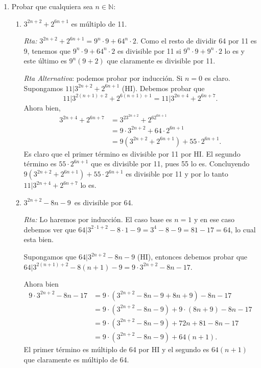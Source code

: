 \documentclass[12pt,spanish,makeidx]{amsbook}
\newcommand{\rta}{\noindent\textit{Rta: }}
\begin{document}
\begin{enumerate}
\begin{enumerate}
	\rta  Verdadero, $b\ge1 \Rightarrow a= bc\ge c$ y $ c\ge1 \Rightarrow bc\ge b$.
\end{enumerate}


\smallskip

\item Probar que cualquiera sea $n \in {\mathbb N}$:
\begin{enumerate}
	\item $3^{2n+2}+ 2^{6n+1}$ es múltiplo de 11.
	
	\rta $3^{2n+2} + 2^{6n+1}=9^n \cdot 9+64^n \cdot 2$. Como el resto de dividir 64 por 11 es 9, tenemos que $9^n \cdot 9+64^n \cdot 2$ es divisible por 11 si $9^n \cdot 9+9^n \cdot 2$ lo es y este último es $9^n(9+2)$ que claramente es divisible por 11.
	
\textit{Rta	Alternativa}: podemos probar por inducción. Si $n=0$ es claro. Supongamos $11\vert 3^{2n+2} + 2^{6n+1}$ (HI). Debemos probar que  
$$11\vert 3^{2(n+1)+2} + 2^{6(n+1)+1} = 11\vert 3^{2n+4} + 2^{6n+7}.$$
Ahora bien,
\begin{align*}
	3^{2n+4} + 2^{6n+7} &=   3^23^{2n+2} + 2^62^{6n+1} \\
	&= 9\cdot3^{2n+2} + 64\cdot2^{6n+1} \\
	&= 	9(3^{2n+2} + 2^{6n+1}) +55\cdot 2^{6n+1} .
\end{align*}
   Es claro que el primer término es divisible por 11 por HI. El segundo término es $55\cdot 2^{6n+1}$ que es divisible por 11, pues 55 lo es. Concluyendo $9(3^{2n+2} + 2^{6n+1}) +55\cdot 2^{6n+1} $ es divisible por  11 y por lo tanto  $ 11\vert 3^{2n+4} + 2^{6n+7}$ lo es.
	
	\item $3^{2n+2} - 8n - 9$\, es divisible por 64.
	
	\rta Lo haremos por inducción. El caso base es $n=1$ y  en ese caso debemos ver que $64|3^{2\cdot 1+2} - 8\cdot 1 - 9 = 3^4-8-9 = 81-17 =64$, lo cual esta bien.
	
	Supongamos que $64|3^{2n+2} - 8n - 9$ (HI),  entonces debemos probar que $64|3^{2(n+1)+2} - 8(n+1) - 9 = 9\cdot 3^{2n+2} - 8n -17$. 
	
	Ahora bien   
	\begin{align*}
		9\cdot 3^{2n+2} - 8n -17 &=  9\cdot (3^{2n+2} - 8n - 9 + 8n + 9) - 8n -17 \\
		&=   9\cdot (3^{2n+2} - 8n - 9) + 9\cdot(8n + 9) - 8n -17 \\
		&=  9\cdot (3^{2n+2} - 8n - 9) + 72n + 81 - 8n -17 \\
		&= 9\cdot (3^{2n+2} - 8n - 9) + 64(n+1).
	\end{align*}
	El primer término es múltiplo de 64 por HI y  el segundo es $64(n+1)$ que claramente es múltiplo de 64.


\end{enumerate}
\end{enumerate}
\end{document}
